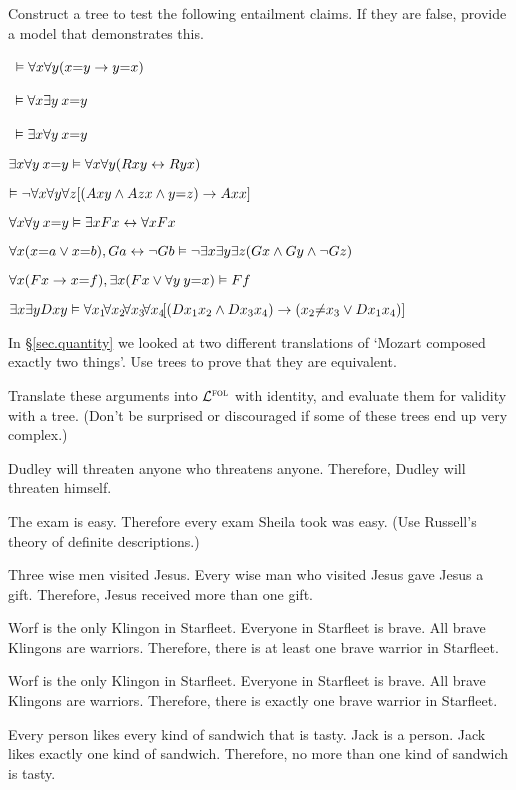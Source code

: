 \solutions
\problempart Construct a tree to test the following entailment claims. If they are false, provide a model that demonstrates this.
\label{pr.IdentityTrees}
\begin{earg}
\item\  $\vDash \forall x \forall y (x{=}y \rightarrow y{=}x)$
\item\ $\vDash \forall x \exists y \: x{=}y$
\item\  $\vDash \exists x \forall y \: x{=}y$
\item   $\exists x \forall y \: x{=}y \vDash \forall x \forall y (Rxy \leftrightarrow Ryx)$
\item   $\vDash \neg \forall x \forall y \forall z [(Axy \wedge Azx \wedge y{=}z) \rightarrow Axx] $
\item  $\forall x \forall y \: x{=}y \vDash \exists x Fx \leftrightarrow \forall x Fx$
\item $\forall x (x{=}a \vee x{=}b), Ga \leftrightarrow \neg Gb \vDash \neg \exists x \exists y \exists z (Gx \wedge Gy \wedge \neg Gz)$
\item $\forall x (Fx \rightarrow x{=}f), \exists x (Fx \vee \forall y \: y{=}x) \vDash Ff$
\item $\exists x \exists y Dxy \vDash \forall x_{1} \! \forall x_{2}\! \forall x_{3}\! \forall x_{4}\! [(Dx_{1}x_{2} \wedge Dx_{3}x_{4}) \rightarrow (x_{2}{\neq}x_{3} \vee Dx_{1}x_{4})]$
\end{earg}

\problempart In \S \ref{sec.quantity} we looked at two different translations of `Mozart composed exactly two things'. Use trees to prove that they are equivalent.

\problempart Translate these arguments into $\mathcal{L}^{\textsc{fol}}$ with identity, and evaluate them for validity with a tree. (Don't be surprised or discouraged if some of these trees end up very complex.)
\label{pr.IdentityArguments}
\begin{earg}
\item Dudley will threaten anyone who threatens anyone. Therefore, Dudley will threaten himself.
\item The exam is easy. Therefore every exam Sheila took was easy. (Use Russell's theory of definite descriptions.)
\item Three wise men visited Jesus. Every wise man who visited Jesus gave Jesus a gift. Therefore, Jesus received more than one gift.
\item Worf is the only Klingon in Starfleet. Everyone in Starfleet is brave. All brave Klingons are warriors. Therefore, there is at least one brave warrior in Starfleet.
\item Worf is the only Klingon in Starfleet. Everyone in Starfleet is brave. All brave Klingons are warriors. Therefore, there is exactly one brave warrior in Starfleet.
\item Every person likes every kind of sandwich that is tasty. Jack is a person. Jack likes exactly one kind of sandwich. Therefore, no more than one kind of sandwich is tasty.
\end{earg}


\fi 
